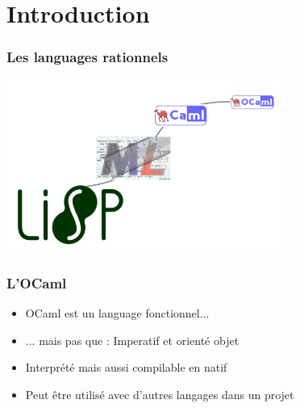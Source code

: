 \section*{Introduction}
\begin{frame}
	\frametitle{Les languages rationnels}
	\includegraphics[width=9cm]{pics/history.png}
\end{frame}

\begin{frame}
	\frametitle{L'OCaml}
	\begin{itemize}
		\item OCaml est un language fonctionnel...
		\item ... mais pas que : Imperatif et orienté objet
		\item Interprété mais aussi compilable en natif
		\item Peut être utilisé avec d'autres langages dans un projet
	\end{itemize}
\end{frame}
